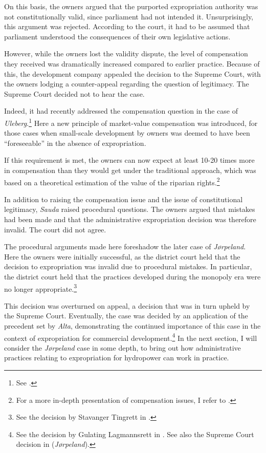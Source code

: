 On this basis, the owners argued that the purported expropriation authority was not constitutionally valid, since parliament had not intended it. Unsurprisingly, this argument was rejected. According to the court, it had to be assumed that parliament understood the consequences of their own legislative actions. 

However, while the owners lost the validity dispute, the level of compensation they received was dramatically increased compared to earlier practice. Because of this, the development company appealed the decision to the Supreme Court, with the owners lodging a counter-appeal regarding the question of legitimacy. The Supreme Court decided not to hear the case. 

Indeed, it had recently addressed the compensation question in the case of {\it Uleberg}.\footnote{See \cite{uleberg08}.} Here a new principle of market-value compensation was introduced, for those cases when small-scale development by owners was deemed to have been ``foreseeable'' in the absence of expropriation.

If this requirement is met, the owners can now expect at least 10-20 times more in compensation than they would get under the traditional approach, which was based on a  theoretical estimation of the value of the riparian rights.\footnote{For a more in-depth presentation of compensation issues, I refer to \cite[71-76]{dyrkolbotn15}.}

In addition to raising the compensation issue and the issue of constitutional legitimacy, {\it Sauda} raised procedural questions. The owners argued that mistakes had been made and that the administrative expropriation decision was therefore invalid. The court did not agree. 

The procedural arguments made here foreshadow the later case of {\it Jørpeland}. Here the owners were initially successful, as the district court held that the decision to expropriation was invalid due to procedural mistakes. In particular, the district court held that the practices  developed during the monopoly era were no longer appropriate.\footnote{See the decision by Stavanger Tingrett in \cite{jorpeland09}.} 

This decision was overturned on appeal, a decision that was in turn upheld by the Supreme Court. Eventually, the case was decided by an application of the precedent set by {\it Alta}, demonstrating the continued importance of this case in the context of expropriation for commercial development.\footnote{See the decision by Gulating Lagmannsrett in \cite{jorpeland11a}. See also the Supreme Court decision in \cite{jorpeland11} ({\it Jørpeland}).} In the next section, I will consider the {\it Jørpeland} case in some depth, to bring out how administrative practices relating to expropriation for hydropower can work in practice.

